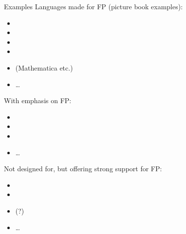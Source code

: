 \begin{frame}{Examples}
	Languages made for FP (picture book examples):
	\begin{itemize}
		\item {}
		\item {}
		\item {}
		\item {}
		\item {} (Mathematica etc.)
		\item \dots
	\end{itemize}
	With emphasis on FP:
	\begin{itemize}
		\item {}
		\item {}
		\item {}
		\item \dots
	\end{itemize}
	Not designed for, but offering strong support for FP:
	\begin{itemize}
		\item {} 
		\item {}
		\item {} (?)  
		\item \dots
	\end{itemize}
\end{frame}

%
%

